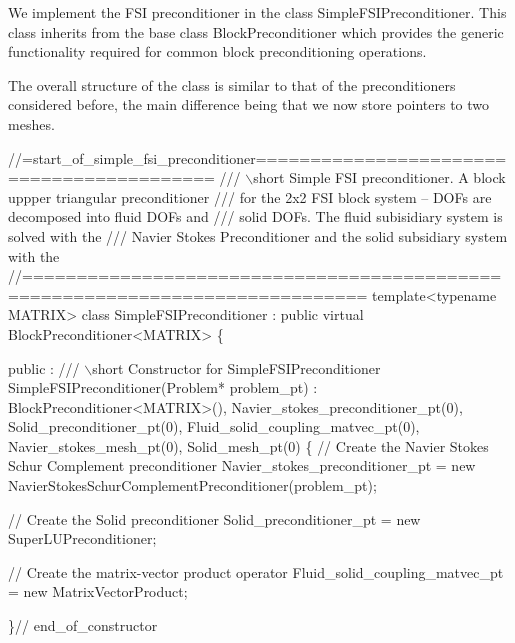 We implement the F\+SI preconditioner in the class {\ttfamily Simple\+F\+S\+I\+Preconditioner}. This class inherits from the base class {\ttfamily Block\+Preconditioner} which provides the generic functionality required for common block preconditioning operations.

The overall structure of the class is similar to that of the preconditioners considered before, the main difference being that we now store pointers to two meshes.

 
\begin{DoxyCodeInclude}
\textcolor{comment}{//=start\_of\_simple\_fsi\_preconditioner========================================== }
\textcolor{comment}{/// \(\backslash\)short Simple FSI preconditioner. A block uppper triangular preconditioner}
\textcolor{comment}{}\textcolor{comment}{/// for the 2x2 FSI block system -- DOFs are decomposed into fluid DOFs and }
\textcolor{comment}{}\textcolor{comment}{/// solid DOFs. The fluid subisidiary system is solved with the }
\textcolor{comment}{}\textcolor{comment}{/// Navier Stokes Preconditioner and the solid subsidiary system with the}
\textcolor{comment}{}\textcolor{comment}{//=============================================================================}
 \textcolor{keyword}{template}<\textcolor{keyword}{typename} MATRIX> 
\textcolor{keyword}{class }SimpleFSIPreconditioner 
 : \textcolor{keyword}{public} \textcolor{keyword}{virtual} BlockPreconditioner<MATRIX>
\{
 
public :
 \textcolor{comment}{}
\textcolor{comment}{ /// \(\backslash\)short Constructor for SimpleFSIPreconditioner}
\textcolor{comment}{} SimpleFSIPreconditioner(Problem* problem\_pt)
  : BlockPreconditioner<MATRIX>(), Navier\_stokes\_preconditioner\_pt(0),
    Solid\_preconditioner\_pt(0), Fluid\_solid\_coupling\_matvec\_pt(0),
    Navier\_stokes\_mesh\_pt(0), Solid\_mesh\_pt(0)
  \{
   \textcolor{comment}{// Create the Navier Stokes Schur Complement preconditioner}
   Navier\_stokes\_preconditioner\_pt = 
    \textcolor{keyword}{new} NavierStokesSchurComplementPreconditioner(problem\_pt);

   \textcolor{comment}{// Create the Solid preconditioner}
   Solid\_preconditioner\_pt = \textcolor{keyword}{new} SuperLUPreconditioner;

   \textcolor{comment}{// Create the matrix-vector product operator}
   Fluid\_solid\_coupling\_matvec\_pt = \textcolor{keyword}{new} MatrixVectorProduct;

  \}\textcolor{comment}{// end\_of\_constructor}
 

\end{DoxyCodeInclude}
